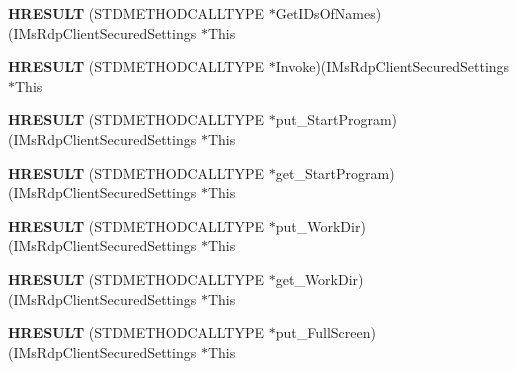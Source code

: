 \begin{DoxyCompactItemize}
\item 
\mbox{\label{struct_i_ms_rdp_client_secured_settings_vtbl_a72090df872028ec362c2d94bf062d0ef}} 
{\bfseries H\+R\+E\+S\+U\+LT} (S\+T\+D\+M\+E\+T\+H\+O\+D\+C\+A\+L\+L\+T\+Y\+PE $\ast$Get\+I\+Ds\+Of\+Names)(I\+Ms\+Rdp\+Client\+Secured\+Settings $\ast$This
\item 
\mbox{\label{struct_i_ms_rdp_client_secured_settings_vtbl_a35b141e80f23ceef00772ae3d26f2065}} 
{\bfseries H\+R\+E\+S\+U\+LT} (S\+T\+D\+M\+E\+T\+H\+O\+D\+C\+A\+L\+L\+T\+Y\+PE $\ast$Invoke)(I\+Ms\+Rdp\+Client\+Secured\+Settings $\ast$This
\item 
\mbox{\label{struct_i_ms_rdp_client_secured_settings_vtbl_a3f97d27eaf23aac899346df39f82fe85}} 
{\bfseries H\+R\+E\+S\+U\+LT} (S\+T\+D\+M\+E\+T\+H\+O\+D\+C\+A\+L\+L\+T\+Y\+PE $\ast$put\+\_\+\+Start\+Program)(I\+Ms\+Rdp\+Client\+Secured\+Settings $\ast$This
\item 
\mbox{\label{struct_i_ms_rdp_client_secured_settings_vtbl_a1034bf1298ebdc1747bd9f7cc74c80a0}} 
{\bfseries H\+R\+E\+S\+U\+LT} (S\+T\+D\+M\+E\+T\+H\+O\+D\+C\+A\+L\+L\+T\+Y\+PE $\ast$get\+\_\+\+Start\+Program)(I\+Ms\+Rdp\+Client\+Secured\+Settings $\ast$This
\item 
\mbox{\label{struct_i_ms_rdp_client_secured_settings_vtbl_ac2a3462f8e8e1c1a7678fccba9072e39}} 
{\bfseries H\+R\+E\+S\+U\+LT} (S\+T\+D\+M\+E\+T\+H\+O\+D\+C\+A\+L\+L\+T\+Y\+PE $\ast$put\+\_\+\+Work\+Dir)(I\+Ms\+Rdp\+Client\+Secured\+Settings $\ast$This
\item 
\mbox{\label{struct_i_ms_rdp_client_secured_settings_vtbl_a52e1cd0fb7b14af48fbd1a7527a0b95c}} 
{\bfseries H\+R\+E\+S\+U\+LT} (S\+T\+D\+M\+E\+T\+H\+O\+D\+C\+A\+L\+L\+T\+Y\+PE $\ast$get\+\_\+\+Work\+Dir)(I\+Ms\+Rdp\+Client\+Secured\+Settings $\ast$This
\item 
\mbox{\label{struct_i_ms_rdp_client_secured_settings_vtbl_a1d6c095d501772f9c8d80d0cd5cbfc59}} 
{\bfseries H\+R\+E\+S\+U\+LT} (S\+T\+D\+M\+E\+T\+H\+O\+D\+C\+A\+L\+L\+T\+Y\+PE $\ast$put\+\_\+\+Full\+Screen)(I\+Ms\+Rdp\+Client\+Secured\+Settings $\ast$This

\end{DoxyCompactItemize}
